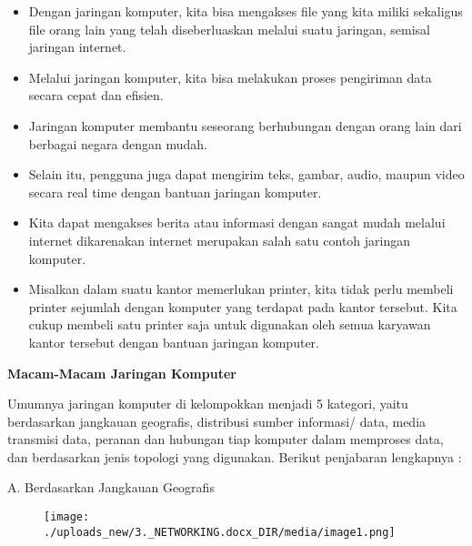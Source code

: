 \documentclass{wileySix}
\begin{document}
\begin{itemize}
	\item Dengan jaringan komputer, kita bisa mengakses file yang kita miliki sekaligus file orang lain yang telah diseberluaskan melalui suatu jaringan, semisal jaringan internet. \par
	\noindent 
	\item Melalui jaringan komputer, kita bisa melakukan proses pengiriman data secara cepat dan efisien. \par
	\noindent 
	\item Jaringan komputer membantu seseorang berhubungan dengan orang lain dari berbagai negara dengan mudah. \par
	\noindent 
	\item Selain itu, pengguna juga dapat mengirim teks, gambar, audio, maupun video secara real time dengan bantuan jaringan komputer. \par
	\noindent 
	\item Kita dapat mengakses berita atau informasi dengan sangat mudah melalui internet dikarenakan internet merupakan salah satu contoh jaringan komputer. \par
	\noindent 
	\item Misalkan dalam suatu kantor memerlukan printer, kita tidak perlu membeli printer sejumlah dengan komputer yang terdapat pada kantor tersebut. Kita cukup membeli satu printer saja untuk digunakan oleh semua karyawan kantor tersebut dengan bantuan jaringan komputer.\end{itemize}
\par
\vspace{12pt}
\noindent 
\textbf{Macam-Macam Jaringan Komputer} \par
Umumnya jaringan komputer di kelompokkan menjadi 5 kategori, yaitu berdasarkan jangkauan geografis, distribusi sumber informasi/ data, media transmisi data, peranan dan hubungan tiap komputer dalam memproses data, dan berdasarkan jenis topologi yang digunakan. Berikut penjabaran lengkapnya : \par
\vspace{12pt}
\noindent 
A. Berdasarkan Jangkauan Geografis \par
\noindent 
\begin{center}
	
	
	
	\begin{figure}[H]
		\begin{center}
			\texttt{[image: ./uploads\_new/3.\_NETWORKING.docx\_DIR/media/image1.png]}
		\end{center}
	\end{figure}
	
	
	
	
\end{center}\vspace{12pt}
\end{document}
